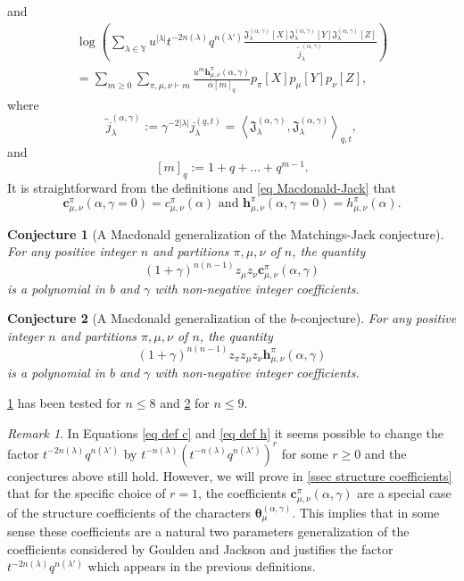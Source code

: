 \documentclass[12pt]{amsart}
\newtheorem{conj}{Conjecture}
\theoremstyle{remark}
\newtheorem{rmq}{Remark}
\newcommand{\bfc}{\boldsymbol{c}}
\newcommand{\bfh}{\boldsymbol{h}}
\newcommand{\MchJack}{{\boldsymbol{\theta}}^{(\alpha,\gamma)}}
\newcommand{\JJack}{{\mathfrak J}^{(\alpha,\gamma)}}
\newcommand{\normJ}{{j}^{(q,t)}}
\newcommand{\normJt}{\widetilde{j}^{(\alpha,\gamma)}}
\begin{document}
and 
\begin{multline}\label{eq def h}
    \log\left(\sum_{\lambda\in\mathbb Y} u^{|\lambda|} t^{-2n(\lambda)}q^{n(\lambda')}\frac{\JJack_\lambda[X]\JJack_\lambda[Y]\JJack_\lambda[Z]}{\normJt_\lambda}\right)\\
    =\sum_{m\geq 0}\sum_{\pi,\mu,\nu\vdash m} \frac{u^m \bfh^\pi_{\mu,\nu}(\alpha,\gamma)}{\alpha [m]_q }p_\pi[X]p_\mu[Y]p_\nu[Z],
\end{multline}
where 
\begin{equation}\label{eq norm j t}
\normJt_\lambda:=\gamma^{-2|\lambda|}\normJ_\lambda=\left\langle\JJack_\lambda,\JJack_\lambda\right\rangle_{q,t},  
\end{equation}
and 
$$[m]_q:=1+q+\dots+q^{m-1}.$$
It is straightforward from the definitions and \cref{eq Macdonald-Jack} that 
$$\bfc^\pi_{\mu,\nu}(\alpha,\gamma=0)=c^\pi_{\mu,\nu}(\alpha)\text{ and }\bfh^\pi_{\mu,\nu}(\alpha,\gamma=0)=h^\pi_{\mu,\nu}(\alpha).$$

\begin{conj}[A Macdonald generalization of the Matchings-Jack conjecture]\label{conj MJ generalized}
For any positive integer $n$ and partitions $\pi,\mu,\nu$ of $n$, the quantity
    $$(1+\gamma)^{n(n-1)}z_\mu z_\nu \bfc^\pi_{\mu,\nu}(\alpha,\gamma)$$
    is a polynomial in $b$ and $\gamma$ with non-negative integer coefficients.
\end{conj}

\begin{conj}[A Macdonald generalization of the \texorpdfstring{$b$}{}-conjecture]\label{b-conj  generalized}
For any positive integer $n$ and partitions $\pi,\mu,\nu$ of $n$, the quantity
    $$(1+\gamma)^{n(n-1)}z_\pi z_\mu z_\nu \bfh^\pi_{\mu,\nu}(\alpha,\gamma)$$
    is a polynomial in $b$ and $\gamma$ with non-negative integer coefficients.
\end{conj}

\cref{conj MJ generalized} has been tested for $n\leq 8$ and \cref{b-conj  generalized} for $n\leq 9$.

\begin{rmq}
In Equations \ref{eq def c} and \cref{eq def h} it seems possible to change the factor $t^{-2n(\lambda)}q^{n(\lambda')}$ by  $t^{-n(\lambda)}(t^{-n(\lambda)}q^{n(\lambda')})^r$ for some $r\geq 0$ and the conjectures above still hold. However, we will prove in \cref{ssec structure coefficients} that for the specific choice of $r=1$, the coefficients  $\bfc^\pi_{\mu,\nu}(\alpha,\gamma)$ are a special case of the structure coefficients of the characters $\MchJack_\mu$. This implies that in some sense these coefficients are a natural two parameters generalization of the coefficients considered by Goulden and Jackson and justifies the factor $t^{-2n(\lambda)}q^{n(\lambda')}$ which appears in the previous definitions.

\end{rmq}
\end{document}

